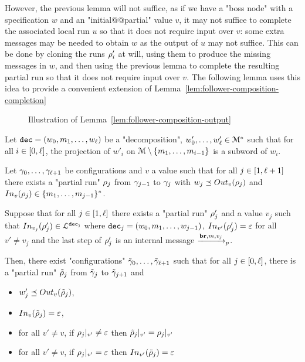 However, the previous lemma will not suffice, as if we have a "boss node" with a specification $w$ and an "initial@@partial" value $v$, it may not suffice to complete the associated local run $u$ so that it does not require input over $v$: some extra messages may be needed to obtain $w$ as the output of $u$ may not suffice. This can be done by cloning the runs $\run_i'$ at will, using them to produce the missing messages in $w$, and then using the previous lemma to complete the resulting partial run so that it does not require input over $v$. The following lemma uses this idea to provide a convenient extension of Lemma~\ref{lem:follower-composition-completion} 

\begin{figure}
	
	\caption{Illustration of Lemma~\ref{lem:follower-composition-output}}
	\label{fig:tree-to-run}
\end{figure}


\begin{lemma}
	\label{lem:follower-composition-output}
	Let $\decsymb = (w_0, m_1, \ldots, w_\ell)$ be a "decomposition", $w'_0, \ldots, w'_\ell \in \messages^*$ such that for all $i \in \nset{0}{\ell}$, the projection of $w'_i$ on $\messages\setminus \set{m_1, \ldots, m_{i-1}}$ is a subword of $w_i$.
	
	Let $\config_0, \ldots, \config_{\ell+1}$ be configurations and $v$ a value such that for all $j \in\nset{1}{\ell+1}$ there exists a "partial run" $\run_j$ from $\config_{j-1}$ to $\config_{j}$ with $w_j \subword \voutput{v}{\run_j}$ and $\vinput{v}{\run_j} \in \set{m_1,\ldots, m_{j-1}}^*$.
	
	Suppose that for all $j \in\nset{1}{\ell}$ there exists a "partial run" $\run'_j$ and a value $v_j$ such that $\vinput{v_j}{\run'_j} \in \langdec{\decsymb_j}$ where $\decsymb_j = (w_0, m_1, \ldots, w_{j-1})$, $\vinput{v'}{\run'_j} = \varepsilon$ for all $v' \neq v_j$ and the last step of $\run'_j$ is an internal message $\intmessage{m}{v_j}$.
	
	Then, there exist "configurations" $\Tilde{\config}_0, \ldots, \Tilde{\config}_{\ell+1}$ such that for all $j \in\nset{0}{\ell}$, there is a "partial run" $\Tilde{\run}_j$ from $\Tilde{\config}_j$ to $\Tilde{\config}_{j+1}$ and
\begin{itemize}
	\item $w'_j \subword \voutput{v}{\Tilde{\run}_j}$, 
	
	\item $\vinput{v}{\Tilde{\run}_j} = \varepsilon$,
	
	\item for all $v' \neq v$, if $\vproj{v'}{\run_j} \neq \varepsilon$ then $\vproj{v'}{\Tilde{\run}_j} = \vproj{v'}{\run_j}$
	
	\item for all $v' \neq v$, if $\vproj{v'}{\run_j} = \varepsilon$ then $\vinput{v'}{\Tilde{\run}_j} = \varepsilon$
\end{itemize}
\end{lemma}

